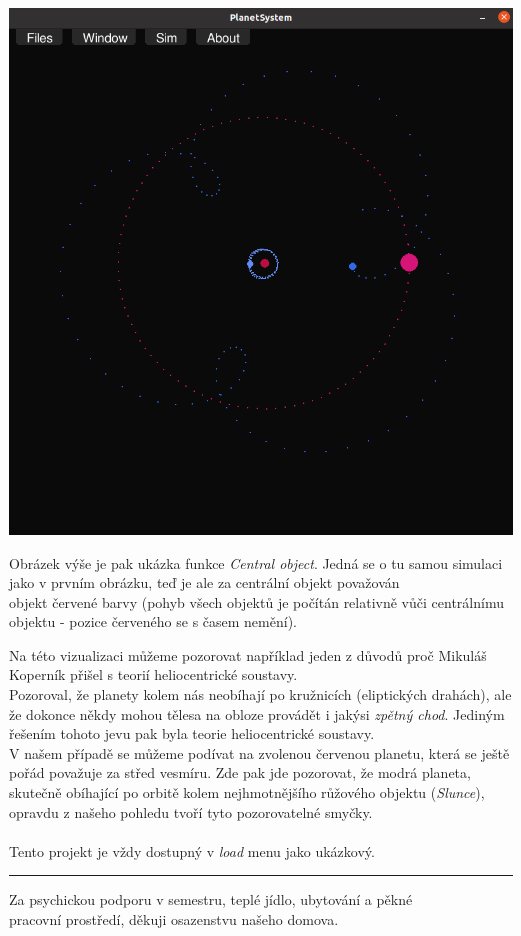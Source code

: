 \documentclass[a4paper, 12pt]{article}
\begin{document}
\begin{center}
\includegraphics[width=0.9\linewidth]{pics/p5_crop.png}
\end{center}

Obrázek výše je pak ukázka funkce \emph{Central object}. Jedná se o tu
samou simulaci jako v prvním obrázku, teď je ale za centrální objekt považován
\\objekt červené barvy (pohyb všech objektů je počítán relativně vůči centrálnímu
objektu - pozice červeného se s časem nemění).

Na této vizualizaci můžeme pozorovat například jeden z důvodů proč Mikuláš
Koperník přišel s teorií heliocentrické soustavy. \\Pozoroval, že planety kolem
nás neobíhají po kružnicích (eliptických drahách), ale že dokonce někdy mohou
tělesa na obloze provádět i jakýsi \emph{zpětný chod}. Jediným řešením tohoto
jevu pak byla teorie heliocentrické soustavy.  \\V našem případě se můžeme
podívat na zvolenou červenou planetu, která se ještě pořád považuje za střed
vesmíru. Zde pak jde pozorovat, že modrá planeta, skutečně obíhající po
orbitě kolem nejhmotnějšího růžového objektu (\emph{Slunce}), opravdu z našeho
pohledu tvoří tyto pozorovatelné smyčky.
\\\\
\footnotesize Tento projekt je vždy dostupný v \emph{load} menu jako ukázkový.\\
\rule{\linewidth}{1pt}
\newpage

\normalsize
Za psychickou podporu v semestru, teplé jídlo, ubytování a pěkné \\pracovní
prostředí, děkuji osazenstvu našeho domova.
\end{document}
